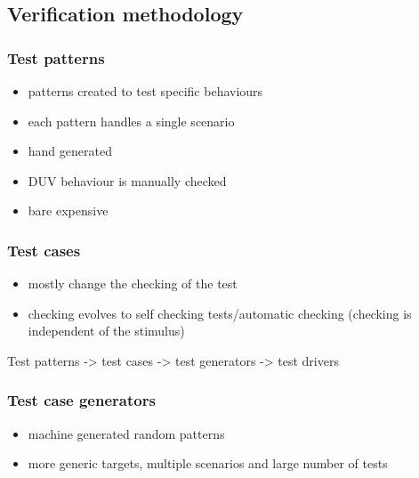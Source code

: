 \documentclass[]{article}
\providecommand{\tightlist}{%
  \setlength{\itemsep}{0pt}\setlength{\parskip}{0pt}}
\begin{document}
\hypertarget{verification-methodology}{%
\subsection{Verification methodology}\label{verification-methodology}}

\hypertarget{test-patterns}{%
\subsubsection{Test patterns}\label{test-patterns}}

\begin{itemize}
\tightlist
\item
  patterns created to test specific behaviours
\item
  each pattern handles a single scenario
\item
  hand generated
\item
  DUV behaviour is manually checked
\item
  bare expensive
\end{itemize}

\hypertarget{test-cases}{%
\subsubsection{Test cases}\label{test-cases}}

\begin{itemize}
\tightlist
\item
  mostly change the checking of the test
\item
  checking evolves to self checking tests/automatic checking (checking
  is independent of the stimulus)
\end{itemize}

Test patterns -\textgreater{} test cases -\textgreater{} test generators
-\textgreater{} test drivers

\hypertarget{test-case-generators}{%
\subsubsection{Test case generators}\label{test-case-generators}}

\begin{itemize}
\tightlist
\item
  machine generated random patterns
\item
  more generic targets, multiple scenarios and large number of tests
\end{itemize}
\end{document}
